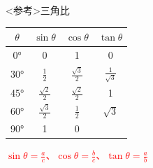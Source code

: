 \documentclass[11pt,twoside]{article}
\begin{document}
\begin{minipage}[t]{0.52\linewidth}
\begin{itembox}[l]{<参考>三角比}
				\begin{minipage}[t]{0.6\linewidth}
					\begin{tabular}{|c|c|c|c|}\hline
						$\theta$ & $\sin\theta$ & $\cos\theta$ & $\tan\theta$ \\\hline
						0° & 0 & 1 & 0 \\\hline
						30° & $\frac{1}{2}$ & $\frac{\sqrt{3}}{2}$ & $\frac{1}{\sqrt{3}}$ \\\hline
						45° & $\frac{\sqrt{2}}{2}$ & $\frac{\sqrt{2}}{2}$ & 1 \\\hline
						60° & $\frac{\sqrt{3}}{2}$ & $\frac{1}{2}$ & $\sqrt{3}$ \\\hline
						90° & 1 & 0 &  \\\hline
					\end{tabular}
				\end{minipage}
				\begin{center}
					\Large
					\textcolor{red}{$\sin\theta=\frac{a}{c}$、$\cos\theta=\frac{b}{c}$、$\tan\theta=\frac{a}{b}$}
				\end{center}
			\end{itembox}
		\end{minipage}
	\clearpage

\end{document}
